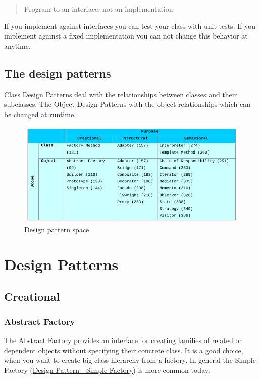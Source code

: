 \documentclass[11pt]{article}
\begin{document}
\begin{quote}
Program to an interface, not an implementation
\end{quote}
If you implement against interfaces you can test your class with unit tests.
If you implement against a fixed implementation you can not change this behavior at anytime.

\subsection{The design patterns}
\label{sec:orgdf3c563}

Class Design Patterns deal with the relationships between classes and their subclasses.
The Object Design Patterns with the object relationships which can be changed at runtime.

\begin{figure}[htbp]
\centering
\includegraphics[width=.9\linewidth]{img/design_pattern_space.png}
\caption{\label{fig:design-pattern-space}Design pattern space}
\end{figure}


\section{Design Patterns}
\label{sec:org728c4a9}
\subsection{Creational}
\label{sec:orgd237e5b}
\subsubsection{Abstract Factory}
\label{sec:orgc45a845}
The Abstract Factory provides an interface for creating families of related or dependent objects without specifying their concrete class.
It is a good choice, when you want to create big class hierarchy from a factory.
In general the Simple Factory (\href{../../../../roam/20220510160458-design_pattern_simple_factory.org}{Design Pattern - Simple Factory}) is more common today.
\end{document}
